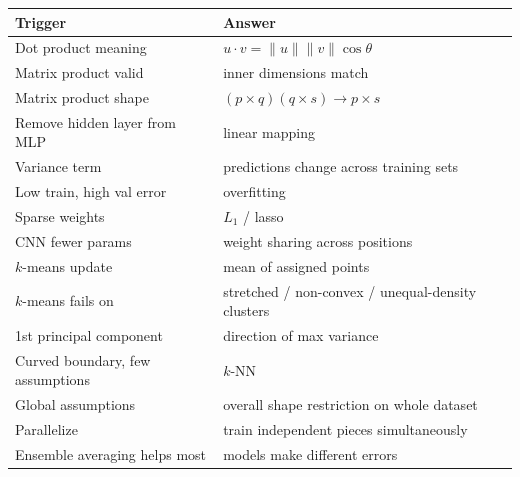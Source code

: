 \documentclass[11pt,landscape]{article}
\begin{document}
	\tiny
	
	\noindent
	\begin{minipage}[t]{0.495\textwidth}
		\centering
		\begin{tabularx}{\linewidth}{@{}L{1.58in}L{2.88in}@{}}
			\toprule
			\textbf{Trigger} & \textbf{Answer} \\
			\midrule
			Dot product meaning & $u\cdot v=\|u\|\|v\|\cos\theta$ \\
			Matrix product valid & inner dimensions match \\
			Matrix product shape & $(p\times q)(q\times s)\to p\times s$ \\
			Remove hidden layer from MLP & linear mapping \\
			Variance term & predictions change across training sets \\
			Low train, high val error & overfitting \\
			Sparse weights & $L_1$ / lasso \\
			CNN fewer params & weight sharing across positions \\
			$k$-means update & mean of assigned points \\
			$k$-means fails on & stretched / non-convex / unequal-density clusters \\
			1st principal component & direction of max variance \\
			Curved boundary, few assumptions & $k$-NN \\
			Global assumptions & overall shape restriction on whole dataset \\
			Parallelize & train independent pieces simultaneously \\
			Ensemble averaging helps most & models make different errors \\
			\bottomrule
		\end{tabularx}
	\end{minipage}\hfill
\end{document}
